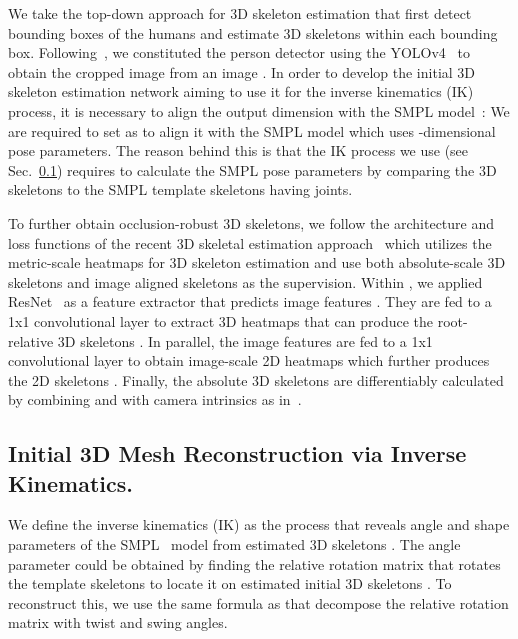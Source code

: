\documentclass[runningheads]{llncs}
\begin{document}
We take the top-down approach for 3D skeleton estimation that first detect bounding boxes of the humans and estimate 3D skeletons within each bounding box. Following~{\cite{ludl2020enhancing,ning2020lighttrack,sarandi2018synthetic,sarandi2020metrabs}}, we constituted the person detector using the YOLOv4~{\cite{bochkovskiy2020yolov4}} to obtain the cropped image  from an image . In order to develop the initial 3D skeleton estimation network  aiming to use it for the inverse kinematics (IK) process, it is necessary to align the output dimension  with the SMPL model~\cite{smpl}: We are required to set  as  to align it with the SMPL model which uses -dimensional pose parameters. The reason behind this is that the IK process we use (see Sec.~\ref{method:Inverse-Kinematics}) requires to calculate the SMPL pose parameters  by comparing the 3D skeletons to the SMPL template skeletons having  joints.

To further obtain occlusion-robust 3D skeletons, we follow the architecture and loss functions of the recent 3D skeletal estimation approach~\cite{sarandi2020metrabs} which utilizes the metric-scale heatmaps for 3D skeleton estimation and use both absolute-scale 3D skeletons and image aligned skeletons as the supervision. Within , we applied ResNet~\cite{he2016identity} as a feature extractor that predicts image features . They are fed to a 1x1 convolutional layer to extract 3D heatmaps that can produce the root-relative 3D skeletons . In parallel, the image features  are fed to a 1x1 convolutional layer to obtain image-scale 2D heatmaps which further produces the 2D skeletons . Finally, the absolute 3D skeletons  are differentiably calculated by combining  and  with camera intrinsics as in~\cite{sarandi2020metrabs}.

\subsection{Initial 3D Mesh Reconstruction via Inverse Kinematics.} \label{method:Inverse-Kinematics}

We define the inverse kinematics (IK) as the process that reveals angle  and shape  parameters of the SMPL~\cite{smpl} model from estimated 3D skeletons . The angle parameter  could be obtained by finding the relative rotation matrix  that rotates the template skeletons  to locate it on estimated initial 3D skeletons . To reconstruct this, we use the same formula as \cite{li2021hybrik} that decompose the relative rotation matrix with twist and swing angles.
\end{document}
